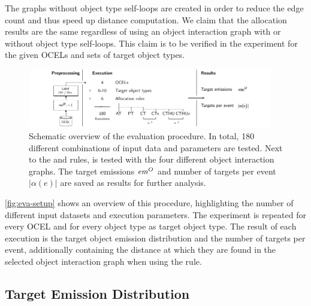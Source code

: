 The graphs without object type self-loops are created in order to reduce the edge count and thus speed up distance computation.
We claim that the allocation results are the same regardless of using an object interaction graph with or without object type self-loops. This claim is to be verified in the experiment for the given OCELs and sets of target object types.

\begin{figure}[t]
  \begin{small}
    \begin{center}
      \includegraphics[width=0.95\textwidth]{figures/concept/evaluation.drawio.pdf}
    \end{center}
    \caption{Schematic overview of the evaluation procedure. In total, 180 different combinations of input data and parameters are tested. Next to the  and  rules,  is tested with the four different object interaction graphs. The target emissions $\mathit{em}^O$ and number of targets per event $|\alpha(e)|$ are saved as results for further analysis.}
    \label{fig:eva-setup}
  \end{small}
\end{figure}

\autoref{fig:eva-setup} shows an overview of this procedure, highlighting the number of different input datasets and execution parameters.
The experiment is repeated for every OCEL and for every object type as target object type.
The result of each execution is the target object emission distribution and the number of targets per event, additionally containing the distance at which they are found in the selected object interaction graph when using the  rule.

\subsection{Target Emission Distribution}
\label{ssec:eva-setup-distr}

